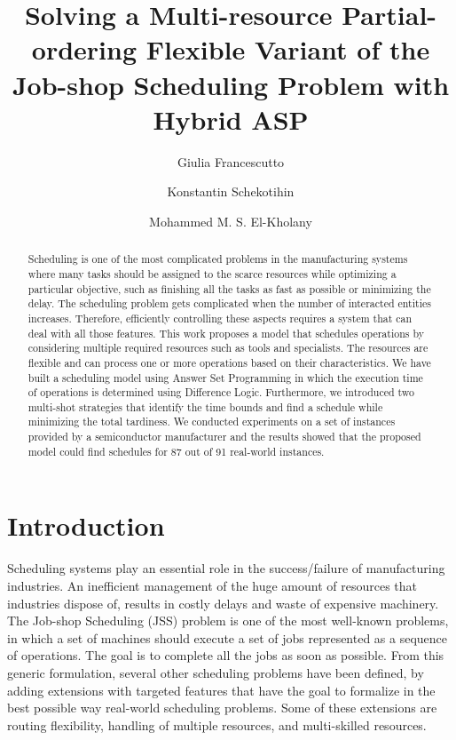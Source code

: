 \documentclass[submission,copyright,creativecommons]{eptcs}
\title{Solving a Multi-resource Partial-ordering Flexible Variant of the Job-shop Scheduling Problem with Hybrid ASP}
\author{Giulia Francescutto
\institute{Siemens AG {\"O}sterreich\\ Vienna, Austria}
\email{giulia.francescutto@siemens.com}
\and
Konstantin Schekotihin
\institute{Univeristy of Klagenfurt\\
Klagenfurt, Austria}
\email{konstantin.schekotihin@aau.at}
\and
Mohammed M. S. El-Kholany
\institute{Univeristy of Klagenfurt\\ Klagenfurt, Austria}
\institute{Cairo University\\ Cairo, Egypt.}
\email{mohammed.el-kholany@aau.at}
}
\begin{document}
\maketitle

\begin{abstract}
  Scheduling is one of the most complicated problems in the manufacturing systems where many tasks should be assigned to the scarce resources while optimizing a particular objective, such as finishing all the tasks as fast as possible or minimizing the delay. The scheduling problem gets complicated when the number of interacted entities increases. Therefore, efficiently controlling these aspects requires a system that can deal with all those features. This work proposes a model that schedules operations by considering multiple required resources such as tools and specialists. The resources are flexible and can process one or more operations based on their characteristics. We have built a scheduling model using Answer Set Programming in which the execution time of operations is determined using Difference Logic. Furthermore, we introduced two multi-shot strategies that identify the time bounds and find a schedule while minimizing the total tardiness. We conducted experiments on a set of instances provided by a semiconductor manufacturer and the results showed that the proposed model could find schedules for 87 out of 91 real-world instances.
\end{abstract}

\section{Introduction}
Scheduling systems play an essential role in the success/failure of manufacturing industries. An inefficient management of the huge amount of resources that industries dispose of, results in costly delays and waste of expensive machinery. The Job-shop Scheduling (JSS) problem is one of the most well-known problems, in which a set of machines should execute a set of jobs represented as a sequence of operations. The goal is to complete all the jobs as soon as possible. From this generic formulation, several other scheduling problems have been defined, by adding extensions with targeted features that have the goal to formalize in the best possible way real-world scheduling problems. Some of these extensions are routing flexibility, handling of multiple resources, and multi-skilled resources. %
\end{document}

